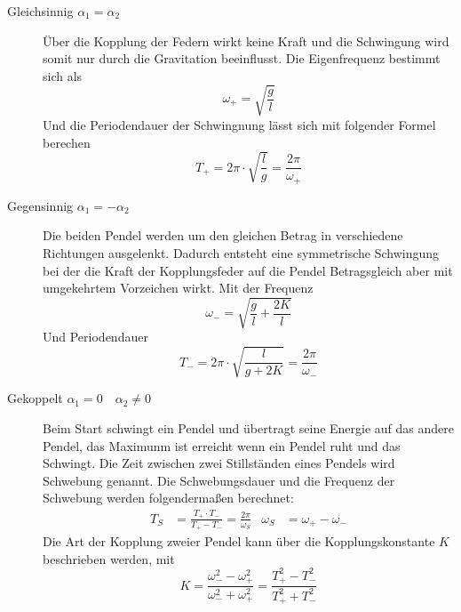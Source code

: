 \begin{description}
    \item[Gleichsinnig $\alpha_1 = \alpha_2$]
        Über die Kopplung der Federn wirkt keine Kraft und die Schwingung wird somit nur durch die Gravitation beeinflusst.
        Die Eigenfrequenz bestimmt sich als
        \begin{equation}
            \omega_+ = \sqrt{\frac{g}{l}} \label{eqn:w_p}
        \end{equation}
        Und die Periodendauer der Schwingnung lässt sich mit folgender Formel berechen 
        \begin{equation}
            T_+ = 2\pi \cdot \sqrt{\frac{l}{g}} = \frac{2\pi}{\omega_+} \label{eqn:T_p}
        \end{equation}
    \item[Gegensinnig $\alpha_1 = -\alpha_2$]
        Die beiden Pendel werden um den gleichen Betrag in verschiedene Richtungen ausgelenkt.
        Dadurch entsteht eine symmetrische Schwingung bei der die Kraft der Kopplungsfeder auf die Pendel Betragsgleich aber mit umgekehrtem Vorzeichen wirkt.
        Mit der Frequenz
        \begin{equation}
            \omega_- = \sqrt{\frac{g}{l}+\frac{2K}{l}}\label{eqn:w_m}
        \end{equation}
        Und Periodendauer
        \begin{equation}
            T_- = 2\pi \cdot \sqrt{\frac{l}{g+2K}} = \frac{2\pi}{\omega_-}\label{eqn:T_m}
        \end{equation}
    \item[Gekoppelt $\alpha_1 =0 \quad \alpha_2 \neq 0$]
        Beim Start schwingt ein Pendel und übertragt seine Energie auf das andere Pendel, das Maximunm ist erreicht wenn ein Pendel ruht und das Schwingt.
        Die Zeit zwischen zwei Stillständen eines Pendels wird Schwebung genannt.
        Die Schwebungsdauer und die Frequenz der Schwebung werden folgendermaßen berechnet:
        \begin{align}
            T_S &= \frac{T_+ \cdot T_-}{T_+ - T_-}=\frac{2\pi}{\omega_S}  & \omega_S &= \omega_+ - \omega_- \label{eqn:Schwebung}
        \end{align}
        Die Art der Kopplung zweier Pendel kann über die Kopplungskonstante $K$ beschrieben werden, mit
        \begin{equation}
            K = \frac{\omega_-^2 - \omega_+^2}{\omega_-^2 + \omega_+^2} = \frac{T_+^2 - T_-^2}{T_+^2 + T_-^2} \label{eqn:Kopplung}
        \end{equation}
\end{description}
